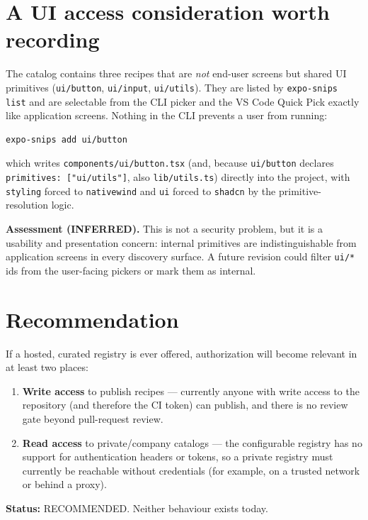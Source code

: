 \section{A UI access consideration worth recording}

The catalog contains three recipes that are \emph{not} end-user screens but shared
UI primitives (\texttt{ui/button}, \texttt{ui/input}, \texttt{ui/utils}). They are
listed by \texttt{expo-snips list} and are selectable from the CLI picker and the
VS Code Quick Pick exactly like application screens. Nothing in the CLI prevents a
user from running:

\begin{lstlisting}[language=bash]
expo-snips add ui/button
\end{lstlisting}

which writes \texttt{components/ui/button.tsx} (and, because \texttt{ui/button}
declares \texttt{primitives: ["ui/utils"]}, also \texttt{lib/utils.ts}) directly
into the project, with \texttt{styling} forced to \texttt{nativewind} and
\texttt{ui} forced to \texttt{shadcn} by the primitive-resolution logic.

\textbf{Assessment (INFERRED).} This is not a security problem, but it is a
usability and presentation concern: internal primitives are indistinguishable from
application screens in every discovery surface. A future revision could filter
\texttt{ui/*} ids from the user-facing pickers or mark them as internal.

\section{Recommendation}

If a hosted, curated registry is ever offered, authorization will become relevant
in at least two places:

\begin{enumerate}
  \item \textbf{Write access} to publish recipes --- currently anyone with write
        access to the repository (and therefore the CI token) can publish, and
        there is no review gate beyond pull-request review.
  \item \textbf{Read access} to private/company catalogs --- the configurable
        registry has no support for authentication headers or tokens, so a private
        registry must currently be reachable without credentials (for example, on a
        trusted network or behind a proxy).
\end{enumerate}

\textbf{Status:} RECOMMENDED. Neither behaviour exists today.
